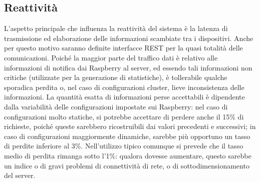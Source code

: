 \subsection{Reattività}
L'aspetto principale che influenza la reattività del sistema è la latenza di trasmissione ed elaborazione delle informazioni scambiate tra i dispositivi. Anche per questo motivo saranno definite interfacce REST per la quasi totalità delle comunicazioni.
Poiché la maggior parte del traffico dati è relativo alle informazioni di notifica dai Raspberry al server, ed essendo tali informazioni non critiche (utilizzate per la generazione di statistiche), è tollerabile qualche sporadica perdita o, nel caso di configurazioni cluster, lieve inconsistenza delle informazioni. La quantità esatta di informazioni perse accettabili è dipendente dalla variabilità delle configurazioni impostate sui Raspberry: nel caso di configurazioni molto statiche, si potrebbe accettare di perdere anche il 15\% di richieste, poiché queste sarebbero ricostruibili dai valori precedenti e successivi; in caso di configurazioni maggiormente dinamiche, sarebbe più opportuno un tasso di perdite inferiore al 3\%. Nell’utilizzo tipico comunque si prevede che il tasso medio di perdita rimanga sotto l’1\%: qualora dovesse aumentare, questo sarebbe un indice o di gravi problemi di connettività di rete, o di sottodimensionamento del server.
